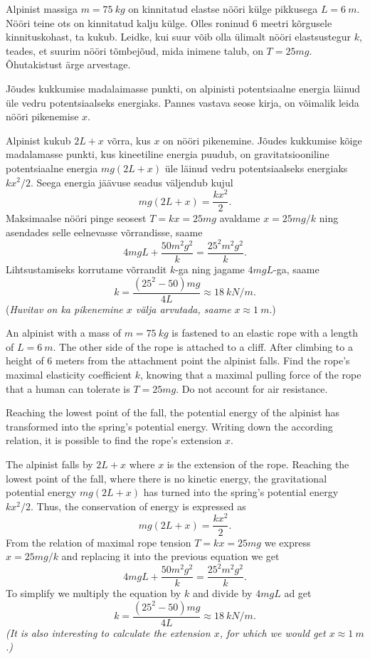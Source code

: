 
Alpinist massiga $m=\SI{75}{kg}$ on kinnitatud elastse nööri külge pikkusega
$L=\SI{6}{m}$. Nööri teine ots on kinnitatud kalju külge. Olles roninud 6 meetri
kõrgusele kinnituskohast, ta kukub. Leidke, kui suur võib olla ülimalt nööri
elastsustegur $k$, teades, et suurim nööri tõmbejõud, mida inimene talub, on
$T=25mg$. Õhutakistust ärge arvestage.

\hint
Jõudes kukkumise madalaimasse punkti, on alpinisti potentsiaalne energia läinud üle vedru potentsiaalseks energiaks. Pannes vastava seose kirja, on võimalik leida nööri pikenemise $x$.

\solu
Alpinist kukub $2L+x$ võrra, kus $x$ on nööri pikenemine. Jõudes kukkumise kõige madalamasse punkti, kus kineetiline energia puudub, on gravitatsiooniline potentsiaalne energia $mg(2L+x)$ üle läinud vedru potentsiaalseks energiaks $kx^2/2$. Seega energia jäävuse seadus väljendub kujul
\[mg(2L+x)=\frac{kx^2}{2}.\]
Maksimaalse nööri pinge seosest $T=kx=25mg$ avaldame $x=25mg/k$ ning asendades selle eelnevasse võrrandisse, saame
\[4mgL+\frac{50m^2g^2}{k}=\frac{25^2m^2g^2}{k}.\]
Lihtsustamiseks korrutame võrrandit $k$-ga ning jagame $4mgL$-ga, saame
\[k=\frac{(25^2-50)mg}{4L}\approx \SI{18}{kN/m}.\]
({\em Huvitav on ka pikenemine $x$ välja arvutada, saame} $x\approx \SI{1}{m}$.)

An alpinist with a mass of $m=\SI{75}{kg}$ is fastened to an elastic rope with a length of $L=\SI{6}{m}$. The other side of the rope is attached to a cliff. After climbing to a height of 6 meters from the attachment point the alpinist falls. Find the rope’s maximal elasticity coefficient $k$, knowing that a maximal pulling force of the rope that a human can tolerate is $T=25mg$. Do not account for air resistance.

\hinteng
Reaching the lowest point of the fall, the potential energy of the alpinist has transformed into the spring’s potential energy. Writing down the according relation, it is possible to find the rope’s extension $x$.

\solueng
The alpinist falls by $2L+x$ where $x$ is the extension of the rope. Reaching the lowest point of the fall, where there is no kinetic energy, the gravitational potential energy $mg(2L+x)$ has turned into the spring’s potential energy $kx^2/2$. Thus, the conservation of energy is expressed as 
\[mg(2L+x)=\frac{kx^2}{2}.\]
From the relation of maximal rope tension $T=kx=25mg$ we express $x=25mg/k$ and replacing it into the previous equation we get
\[4mgL+\frac{50m^2g^2}{k}=\frac{25^2m^2g^2}{k}.\]
To simplify we multiply the equation by $k$ and divide by $4mgL$ ad get 
\[k=\frac{(25^2-50)mg}{4L}\approx \SI{18}{kN/m}.\] 
\emph{(It is also interesting to calculate the extension $x$, for which we would get $x\approx \SI{1}{m}$.)}
\probend